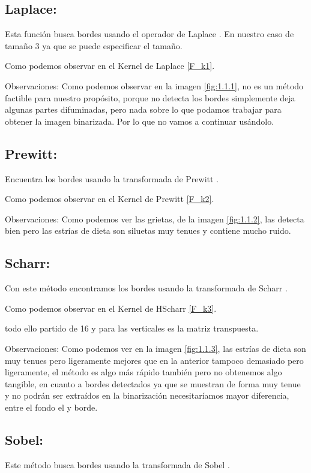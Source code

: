 \subsection{Laplace:}
Esta función busca bordes usando el operador de Laplace \cite{wiki:Laplace}. En nuestro caso de tamaño 3 ya que se puede especificar el tamaño.

Como podemos observar en el Kernel de Laplace \ref{F_k1}.


Observaciones:
Como podemos observar en la imagen \ref{fig:1.1.1}, no es un método factible para nuestro propósito, porque no detecta los bordes simplemente deja algunas partes difuminadas, pero nada sobre lo que podamos trabajar para obtener la imagen binarizada. Por lo que no vamos a continuar usándolo.

\subsection{Prewitt:}

Encuentra los bordes usando la transformada de Prewitt \cite{wiki:Prewitt}.

Como podemos observar en el Kernel de Prewitt \ref{F_k2}.



Observaciones:
Como podemos ver las grietas, de la imagen \ref{fig:1.1.2}, las detecta bien pero las estrías de dieta son siluetas muy tenues y contiene mucho ruido.


\subsection{Scharr:}
Con este método encontramos los bordes usando la transformada de Scharr \cite{wiki:Scharr}.

Como podemos observar en el Kernel de HScharr \ref{F_k3}.

todo ello partido de 16 y para las verticales es la matriz transpuesta. 




Observaciones:
Como podemos ver en la imagen \ref{fig:1.1.3}, las estrías de dieta son muy tenues pero ligeramente mejores que en la anterior tampoco demasiado pero ligeramente, el método es algo más rápido también pero no obtenemos algo tangible, en cuanto  a bordes detectados ya que se muestran de forma muy tenue y no podrán ser extraídos en la binarización necesitaríamos mayor diferencia, entre el fondo el y borde.




\subsection{Sobel:}
Este método busca bordes usando la transformada de Sobel \cite{wiki:Sobel}.


